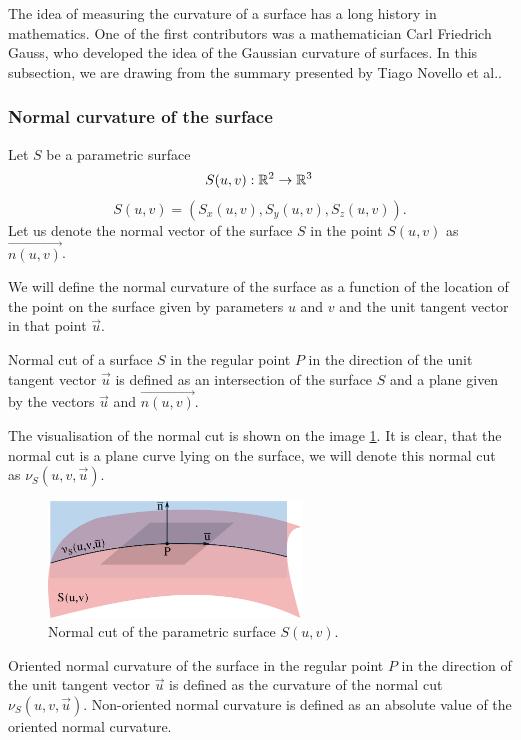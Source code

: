 The idea of measuring the curvature of a surface has a long history in mathematics.
One of the first contributors was a mathematician Carl Friedrich Gauss, who developed
the idea of the Gaussian curvature of surfaces. In this subsection, we are drawing from
the summary presented by Tiago Novello et al.\cite{novello2021differential}.

\subsubsection*{Normal curvature of the surface}

Let $S$ be a parametric surface $$S(u, v): \mathbb{R}^2 \to \mathbb{R}^3$$ $$S(u, v) = (S_x(u,v), S_y(u,v), S_z(u,v)).$$
Let us denote the normal vector of the surface $S$ in the point $S(u, v)$ as $\overrightarrow{n(u, v)}$.

We will define the normal curvature of the surface as a function of the location of the point
on the surface given by parameters $u$ and $v$ and the unit tangent vector in that point $\overrightarrow{u}$. 

\begin{definition}
Normal cut of a surface $S$ in the regular point $P$ in the direction of the unit tangent vector 
$\overrightarrow{u}$ is defined as an intersection of the surface $S$ and a plane
given by the vectors $\overrightarrow{u}$ and $\overrightarrow{n(u, v)}$. 
\end{definition}

The visualisation of the normal cut is shown on the image \ref{img:14}.
It is clear, that the
normal cut is a plane curve lying on the surface, we will denote this normal cut as $\nu_S(u, v, \overrightarrow{u})$.

\begin{figure}
    \centerline{\includegraphics[width=0.6\textwidth]{images/img14}}
    \caption[Normal cut]
    {Normal cut of the parametric surface $S(u,v)$.}
    \label{img:14}
\end{figure}

\begin{definition}
    Oriented normal curvature of the surface in the regular point $P$ in the direction of the unit tangent vector
    $\overrightarrow{u}$ is defined as the curvature of the normal cut $\nu_S(u, v, \overrightarrow{u})$.
    Non-oriented normal curvature is defined as an absolute value of the oriented normal curvature.
\end{definition}

